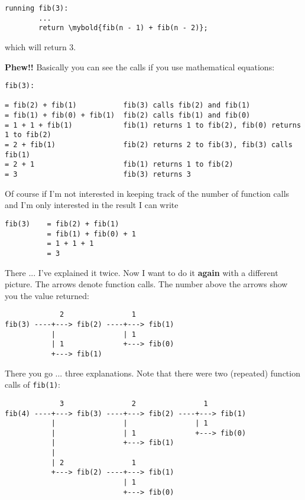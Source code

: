 \begin{Verbatim}[frame=single, commandchars=\\\{\}]
    running fib(3):
        ...
        return \mybold{fib(n - 1) + fib(n - 2)};
\end{Verbatim}

which will return 3.


\textbf{Phew!!} Basically you can see the calls if you use mathematical equations:
{\small
\begin{Verbatim}
fib(3):
  
= fib(2) + fib(1)           fib(3) calls fib(2) and fib(1)
= fib(1) + fib(0) + fib(1)  fib(2) calls fib(1) and fib(0)
= 1 + 1 + fib(1)            fib(1) returns 1 to fib(2), fib(0) returns 1 to fib(2)
= 2 + fib(1)                fib(2) returns 2 to fib(3), fib(3) calls fib(1)
= 2 + 1                     fib(1) returns 1 to fib(2)
= 3                         fib(3) returns 3
      \end{Verbatim}
      }



\newpage
Of course if I'm not interested in keeping track of the number of function
calls and I'm only interested in
the result I can write

\begin{Verbatim}
fib(3)    = fib(2) + fib(1)
          = fib(1) + fib(0) + 1
          = 1 + 1 + 1
          = 3
\end{Verbatim}
        
There ... I've explained it twice. Now I want to do it \textbf{again} with a different picture. The arrows denote
function calls. The number above the arrows show you the value returned:

\begin{Verbatim}
             2                1
fib(3) ----+---> fib(2) ----+---> fib(1)
           |                | 1
           | 1              +---> fib(0)
           +---> fib(1)
\end{Verbatim}
         
There you go ... three explanations. Note that there were two (repeated) function calls of \verb!fib(1)!:

\begin{Verbatim}
             3                2                1
fib(4) ----+---> fib(3) ----+---> fib(2) ----+---> fib(1)
           |                |                | 1
           |                | 1              +---> fib(0)
           |                +---> fib(1)
           |
           | 2                1
           +---> fib(2) ----+---> fib(1)
                            | 1
                            +---> fib(0)
\end{Verbatim}

